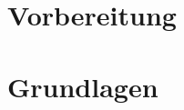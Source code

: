 \documentclass[12pt,english,ngerman]{scrartcl}
\begin{document}

\tableofcontents
\newpage




 

\section{Vorbereitung}\label{sec:Vorbereitung}
% 
% 


\section{Grundlagen}\label{sec:Grundlagen}


\end{document}
